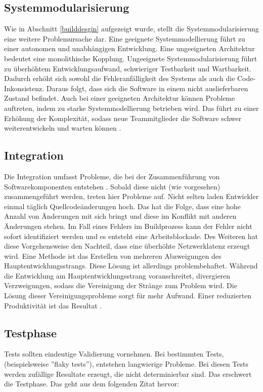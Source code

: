 \subsection{Systemmodularisierung}  \label{Systemmodularisierung}
Wie in Abschnitt \ref{builddesgin} aufgezeigt wurde, stellt die Systemmodularisierung eine weitere Problemursache dar. Eine geeignete Systemmodellierung führt zu einer autonomen und unabhängigen Entwicklung. Eine ungeeigneten Architektur bedeutet eine monolithische Kopplung. Ungeeignete Systemmodularisierung führt zu überhöhtem Entwicklungsaufwand, schwieriger Testbarkeit und Wartbarkeit. Dadurch erhöht sich sowohl die Fehleranfälligkeit des Systems als auch die Code-Inkonsistenz. Daraus folgt, dass sich die Software in einem nicht auslieferbaren Zustand befindet. Auch bei einer geeigneten Architektur können Probleme auftreten, indem zu starke Systemmodellierung betrieben wird. Das führt zu einer Erhöhung der Komplexität, sodass neue Teammitglieder die Software schwer weiterentwickeln und warten können \cite{Laukkanen.2017}. 

\subsection{Integration} \label{Integration}
Die Integration umfasst Probleme, die bei der Zusammenführung von Softwarekomponenten entstehen \cite{LianpingEtPaddy.2015}. Sobald diese nicht (wie vorgesehen) zusammengeführt werden, treten hier Probleme auf. Nicht selten laden Entwickler einmal täglich Quellcodeänderungen hoch. Das hat die Folge, dass eine hohe Anzahl von Änderungen mit sich bringt und diese im Konflikt mit anderen Änderungen stehen. Im Fall eines Fehlers im Buildprozess kann der Fehler nicht sofort identifiziert werden und es entsteht eine Arbeitsblockade. Des Weiteren hat diese Vorgehensweise den Nachteil, dass eine überhöhte Netzwerklatenz erzeugt wird. Eine Methode ist das Erstellen von mehreren Abzweigungen des Hauptentwicklungsstrangs. Diese Lösung ist allerdings problembehaftet. Während die Entwicklung am Hauptentwicklungsstrang voranschreitet, divergieren Verzweigungen, sodass die Vereinigung der Stränge zum Problem wird. Die Lösung dieser Vereinigungsprobleme sorgt für mehr Aufwand.  Einer reduzierten Produktivität ist das Resultat \cite{Laukkanen.2017}. 

\subsection{Testphase}
Tests sollten eindeutige Validierung vornehmen. Bei bestimmten Tests, (beispielsweise ''flaky tests''), entstehen langwierige Probleme. Bei diesen Tests werden zufällige Resultate erzeugt, die nicht determinierbar sind. Das erschwert die Testphase. Das geht aus dem folgenden Zitat hervor: 

